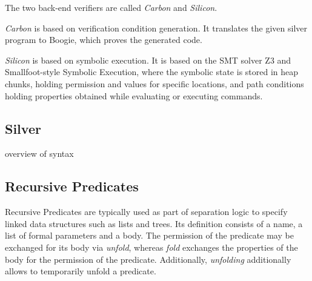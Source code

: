 \documentclass[12pt]{article}
\begin{document}
The two back-end verifiers are called \textit{Carbon} and \textit{Silicon}. 

\textit{Carbon}  is based on verification condition generation. It translates the given silver program to Boogie\cite{leino2008boogie}, which proves the generated code.%

\textit{Silicon} is based on symbolic execution. It is based on the SMT solver Z3\cite{de2008z3} and Smallfoot-style Symbolic Execution\cite{berdine2005smallfoot}, where the symbolic state is stored in heap chunks, holding permission and values for specific locations, and path conditions holding properties obtained while evaluating or executing commands.

\subsection{Silver}
overview of syntax

\subsection{Recursive Predicates}
Recursive Predicates\cite{parkinson2005separation} are typically used as part of separation logic to specify linked data structures such as lists and trees. Its definition consists of a name, a list of formal parameters and a body. The permission of the predicate may be exchanged for its body via \textit{unfold}, whereas \textit{fold} exchanges the properties of the body for the permission of the predicate. Additionally, \textit{unfolding} additionally allows to temporarily unfold a predicate.


\end{document}
